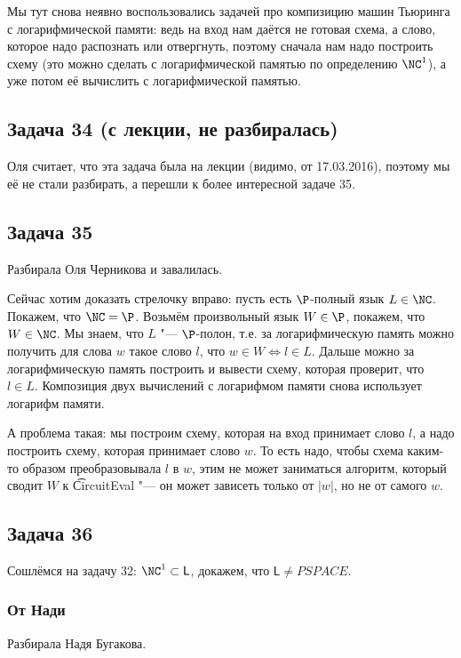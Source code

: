 	\begin{Rem}
		Мы тут снова неявно воспользовались задачей про компизицию машин Тьюринга
		с логарифмической памяти: ведь на вход нам даётся не готовая схема,
		а слово, которое надо распознать или отвергнуть, поэтому сначала нам надо
		построить схему (это можно сделать с логарифмической памятью по определению
		$\NC^1$), а уже потом её вычислить с логарифмической памятью.
	\end{Rem}

\subsection{Задача 34 (с лекции, не разбиралась)}
	Оля считает, что эта задача была на лекции (видимо, от 17.03.2016),
	поэтому мы её не стали разбирать, а перешли к более интересной задаче 35.

\subsection{Задача 35}
	Разбирала Оля Черникова и завалилась.

	Сейчас хотим доказать стрелочку вправо: пусть есть $\P$-полный язык $L \in \NC$.
	Покажем, что $\NC=\P$.
	Возьмём произвольный язык $W \in \P$, покажем, что $W \in \NC$.
	Мы знаем, что $L$ "--- $\P$-полон, т.е. за логарифмическую память можно
	получить для слова $w$ такое слово $l$, что $w \in W \iff l \in L$.
	Дальше можно за логарифмическую память построить и вывести схему, которая проверит, что
	$l \in L$.
	Композиция двух вычислений с логарифмом памяти снова использует логарифм памяти.

	А проблема такая: мы построим схему, которая на вход принимает слово $l$, а надо
	построить схему, которая принимает слово $w$.
	То есть надо, чтобы схема каким-то образом преобразовывала $l$ в $w$, этим не может заниматься
	алгоритм, который сводит $W$ к \t{CircuitEval} "--- он может зависеть только от $|w|$, но не
	от самого $w$.

\subsection{Задача 36}
	Сошлёмся на задачу 32: $\NC^1 \subset \mathsf{L}$, докажем, что $\mathsf{L} \neq PSPACE$.
	\subsubsection{От Нади}
		Разбирала Надя Бугакова.

